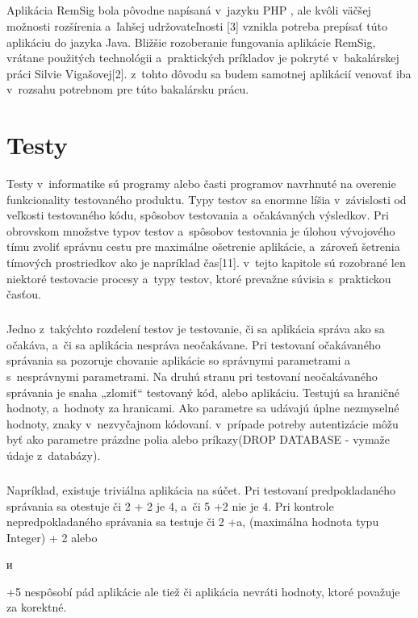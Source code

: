 \documentclass[
  printed, %
  notable,   %
  nolof,     %
    oneside,       %
  nolot,     %
]{fithesis3}
\begin{document}
\paragraph{}
Aplikácia RemSig bola pôvodne napísaná v~jazyku PHP , ale kvôli väčšej možnosti rozšírenia a~ľahšej udržovateľnosti [3] vznikla potreba prepísať túto aplikáciu do jazyka Java.  Bližšie rozoberanie fungovania aplikácie RemSig, vrátane použitých technológii a~praktických príkladov je pokryté v~bakalárskej práci Silvie Vigašovej[2]. z~tohto dôvodu sa budem samotnej aplikácií venovať iba v~rozsahu potrebnom pre túto bakalársku prácu.



\chapter{Testy}
Testy v~informatike sú programy alebo časti programov navrhnuté na overenie funkcionality testovaného produktu. Typy testov sa enormne líšia v~závislosti od veľkosti testovaného kódu, spôsobov testovania a~očakávaných výsledkov. Pri obrovskom množstve typov testov a~spôsobov testovania je úlohou vývojového tímu zvoliť správnu cestu pre maximálne ošetrenie aplikácie, a~zároveň šetrenia tímových prostriedkov ako je napríklad čas[11].  v~tejto kapitole sú rozobrané len niektoré testovacie procesy a~typy testov, ktoré prevažne súvisia s~praktickou časťou.\paragraph{}
Jedno z~takýchto rozdelení testov je  testovanie, či sa aplikácia správa ako sa očakáva, a~či sa aplikácia nespráva neočakávane. Pri testovaní očakávaného správania sa pozoruje chovanie aplikácie so správnymi parametrami a~ s~nesprávnymi parametrami. Na druhú stranu pri testovaní neočakávaného správania je snaha „zlomiť“ testovaný kód, alebo aplikáciu. Testujú sa hraničné hodnoty, a~hodnoty za hranicami. Ako parametre sa udávajú úplne nezmyselné hodnoty, znaky v~nezvyčajnom kódovaní. v~prípade potreby autentizácie môžu byť ako parametre prázdne polia alebo príkazy(DROP DATABASE - vymaže údaje z~databázy). \paragraph{}
Napríklad, existuje triviálna aplikácia na súčet. Pri testovaní predpokladaného správania sa otestuje či 2 + 2 je 4, a~či 5 +2 nie je 4. Pri kontrole nepredpokladaného správania sa testuje či 2 +a, (maximálna hodnota typu Integer) + 2 alebo \begin{otherlanguage}{russian} и \end{otherlanguage}  +5   nespôsobí pád aplikácie ale tiež či aplikácia nevráti hodnoty, ktoré považuje za korektné.\paragraph{}
\end{document}
